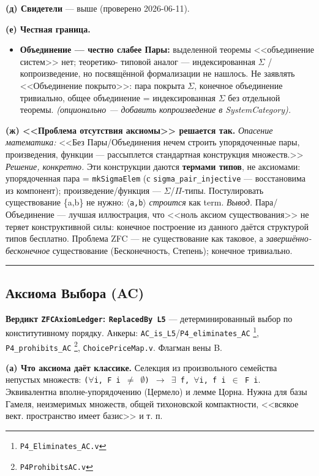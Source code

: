 \documentclass[11pt,a4paper]{article}
\begin{document}
\textbf{(д) Свидетели} --- выше (проверено 2026-06-11).

\textbf{(е) Честная граница.}
\begin{itemize}
\item \textbf{Объединение --- честно слабее Пары:} выделенной теоремы <<объединение систем>> нет; теоретико- типовой аналог --- индексированная $\Sigma$ / копроизведение, но посвящённой формализации не нашлось. Не заявлять <<Объединение покрыто>>: пара покрыта $\Sigma$, конечное объединение тривиально, общее объединение = индексированная $\Sigma$ без отдельной теоремы. \emph{(опционально --- добавить копроизведение в SystemCategory).}
\end{itemize}

\textbf{(ж) <<Проблема отсутствия аксиомы>> решается так.} \emph{Опасение математика:} <<Без Пары/Объединения нечем строить упорядоченные пары, произведения, функции --- рассыплется стандартная конструкция множеств.>> \emph{Решение, конкретно.} Эти конструкции даются \textbf{термами типов}, не аксиомами: упорядоченная пара = \texttt{mk\allowbreak{}Sigma\allowbreak{}Elem} (с \texttt{sigma\_\allowbreak{}pair\_\allowbreak{}injective} --- восстановима из компонент); произведение/функция --- $\Sigma$/$\Pi$-типы. Постулировать существование \{a,b\} не нужно: \texttt{$\langle$a,\allowbreak{}b$\rangle$} \emph{строится} как term. \emph{Вывод.} Пара/Объединение --- лучшая иллюстрация, что <<ноль аксиом существования>> не теряет конструктивной силы: конечное построение из данного даётся структурой типов бесплатно. Проблема ZFC --- не существование как таковое, а \emph{завершённо-бесконечное} существование (Бесконечность, Степень); конечное тривиально.

\bigskip\hrule\bigskip

\subsection{Аксиома Выбора (AC)}

\textbf{Вердикт \texttt{ZFCAxiom\allowbreak{}Ledger}: \texttt{Replaced\allowbreak{}By L5}} --- детерминированный выбор по конститутивному порядку. Анкеры: \texttt{AC\_\allowbreak{}is\_\allowbreak{}L5}/\texttt{P4\_\allowbreak{}eliminates\_\allowbreak{}AC} \footnote{\texttt{P4\_\allowbreak{}Eliminates\_\allowbreak{}AC.v}}, \texttt{P4\_\allowbreak{}prohibits\_\allowbreak{}AC} \footnote{\texttt{P4Prohibits\allowbreak{}AC.v}}, \texttt{Choice\allowbreak{}Price\allowbreak{}Map.v}. Флагман вены B.

\textbf{(а) Что аксиома даёт классике.} Селекция из произвольного семейства непустых множеств: \texttt{($\forall$i,\allowbreak{} F i $\ne$ $\emptyset$) $\to$ $\exists$ f,\allowbreak{} $\forall$i,\allowbreak{} f i $\in$ F i}. Эквивалентна вполне-упорядочению (Цермело) и лемме Цорна. Нужна для базы Гамеля, неизмеримых множеств, общей тихоновской компактности, <<всякое вект. пространство имеет базис>> и т. п.
\end{document}
